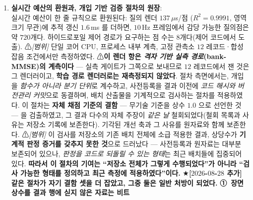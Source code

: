 \documentclass[11pt]{report}
\numberwithin{equation}{chapter}
\numberwithin{figure}{chapter}
\numberwithin{table}{chapter}
\begin{document}
\begin{enumerate}
  \item \textbf{실시간 예산의 환원과, 개입 기반 검증 절차의 원장}: \\
        실시간 예산이 한 줄 규칙으로 환원된다: 질의 렌더 $137\,\mu$s/점
        ($R^2 = 0.9991$, 영역 크기 무관)에 추적 갱신 $1.6$\,ms 를 더하면,
        $10$\,Hz 프레임에서 감당 가능한 질의점은 약 $720$개다. 하이드로포일 제어 경로가
        요구하는 점 수는 $8$개다(제어 코드에서 도출). ⚠\emph{[범위]} 단일 코어 CPU,
        프로세스 내부 계측, 고정 관측소 $12$ 레코드·합성 잡음 조건에서만 측정하였다.
        ⚠\textbf{이 렌더 항은 \emph{격자 기반 실측 경로}(bank-MMSE)의 계측이다} ---
        실측 게이트가 그쪽으로 보내므로 $12$ 레코드에서 잰 것은 그 렌더러이고, \textbf{학습 경로 렌더러로는 재측정되지 않았다}. 
        절차 측면에서는, 개입을 \emph{함수가 아니라 분기 단위}로 계수하고, 사전등록을
        결과 이전에 \emph{코드 해시와 버전관리 커밋}으로 동결하며, 배치 산출물을 기계적으로
        검사하는 절차를 적용하였다. 이 절차는 \textbf{자체 채점 기준의 결함} --- 무기술
        기준을 상수 $1.0$ 으로 선언한 것 --- 을 검출하였고, 그 결과 다수의 자체 주장이 \emph{같은 날}
        철회되었다(철회 목록과 사유는 저장소 기록에 보존한다).
        기각된 개선 축과 그 사유를 원자료와 함께 보존한다.
        ⚠\emph{[범위]} 이 검사를 저장소의 기존 배치 전체에 소급 적용한 결과, 상당수가
        \textbf{기계적 판정 증거를 갖추지 못한 것}으로 드러났다 --- 사전등록과 원자료는
        대부분 보존되어 있으나, \emph{판정을 코드로 되돌릴 수 있는 형태}는 최근 배치들에
        집중되어 있다. \textbf{따라서 이 절차의 기여는 ``저장소 전체가 그렇게 수행되었다''가
        아니라 ``검사 가능한 형태를 정의하고 최근 측정에 적용하였다''이다.}
        ★\textbf{[$2026$-$08$-$28$ 추가] 같은 절차가 자기 결함 셋을 더 잡았고, 그중 둘은
        일반 처방이 되었다.} \textbf{①~장면 상수를 결과 행에 싣지 않은 자료는 비트
}
\end{enumerate}
\end{document}
